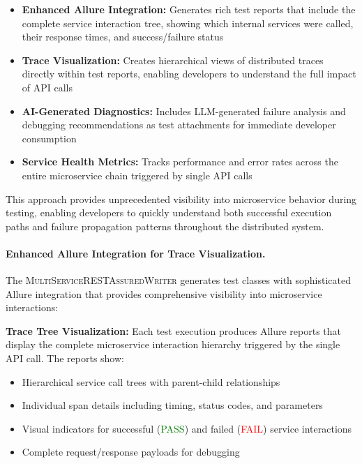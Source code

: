\documentclass[conference]{IEEEtran}
\begin{document}
\begin{itemize}[leftmargin=*]
  \item \textbf{Enhanced Allure Integration:} Generates rich test reports
        that include the complete service interaction tree, showing
        which internal services were called, their response times,
        and success/failure status
  \item \textbf{Trace Visualization:} Creates hierarchical views of
        distributed traces directly within test reports, enabling
        developers to understand the full impact of API calls
  \item \textbf{AI-Generated Diagnostics:} Includes LLM-generated
        failure analysis and debugging recommendations as test
        attachments for immediate developer consumption
  \item \textbf{Service Health Metrics:} Tracks performance and
        error rates across the entire microservice chain triggered
        by single API calls
\end{itemize}

This approach provides unprecedented visibility into microservice behavior during testing, enabling developers to quickly understand both successful execution paths and failure propagation patterns throughout the distributed system.


\paragraph{Enhanced Allure Integration for Trace Visualization.}
The \textsc{MultiServiceRESTAssuredWriter} generates test classes with sophisticated Allure integration that provides comprehensive visibility into microservice interactions:

\textbf{Trace Tree Visualization:} Each test execution produces Allure reports that display the complete microservice interaction hierarchy triggered by the single API call. The reports show:
\begin{itemize}[leftmargin=*]
\item Hierarchical service call trees with parent-child relationships
\item Individual span details including timing, status codes, and parameters
\item Visual indicators for successful (\textcolor{green}{PASS}) and failed (\textcolor{red}{FAIL}) service interactions
\item Complete request/response payloads for debugging
\end{itemize}
\end{document}

